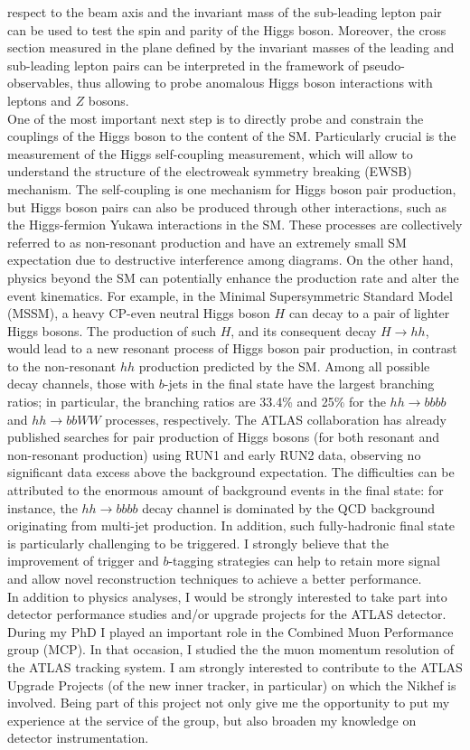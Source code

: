 \begin{cvinterests}
{respect to the beam axis and the invariant mass of the sub-leading lepton pair
can be used to test the spin and parity of the Higgs boson. Moreover, the cross
section measured in the plane defined by the invariant masses of the leading
and sub-leading lepton pairs can be interpreted in the framework of
pseudo-observables, thus allowing to probe anomalous Higgs boson interactions
with leptons and $Z$ bosons.\\
One of the most important next step is to directly probe and constrain the
couplings of the Higgs boson to the content of the SM. Particularly crucial is
the measurement of the Higgs self-coupling measurement, which will allow to
understand the structure of the electroweak symmetry breaking (EWSB) mechanism.
The self-coupling is one mechanism for Higgs boson pair production, but Higgs
boson pairs can also be produced through other interactions, such as the
Higgs-fermion Yukawa interactions in the SM. These processes are collectively
referred to as non-resonant production and have an extremely small SM
expectation due to destructive interference among diagrams. On the other hand,
physics beyond the SM can potentially enhance the production rate and alter the
event kinematics. For example, in the Minimal Supersymmetric Standard Model
(MSSM), a heavy CP-even neutral Higgs boson $H$ can decay to a pair of lighter
Higgs bosons. The production of such $H$, and its consequent decay $H\to hh$,
would lead to a new resonant process of Higgs boson pair production, in
contrast to the non-resonant $hh$ production predicted by the SM.
Among all possible decay channels, those with $b$-jets in the final state have
the largest branching ratios; in particular, the branching ratios are 33.4\%
and 25\% for the $hh\to bbbb$ and $hh\to bbWW$ processes, respectively.
The ATLAS collaboration has already published searches for pair production of
Higgs bosons (for both resonant and non-resonant production) using RUN1 and
early RUN2 data, observing no significant data excess above the background
expectation. The difficulties can be attributed to the enormous amount of
background events in the final state: for instance, the $hh\to bbbb$ decay
channel is dominated by the QCD background originating from multi-jet
production. In addition, such fully-hadronic final state is particularly
challenging to be triggered. I strongly believe that the improvement of trigger
and $b$-tagging strategies can help to retain more signal and allow novel
reconstruction techniques to achieve a better performance.\\
In addition to physics analyses, I would be strongly interested to take part
into detector performance studies and/or upgrade projects for the ATLAS
detector. During my PhD I played an important role in the Combined Muon
Performance group (MCP). In that occasion, I studied the the muon momentum
resolution of the ATLAS tracking system. I am strongly interested to contribute
to the ATLAS Upgrade Projects (of the new inner tracker, in particular) on which
the Nikhef is involved. Being part of this project not only give me the
opportunity to put my experience at the service of the group, but also broaden
my knowledge on detector instrumentation.
}

\end{cvinterests}
